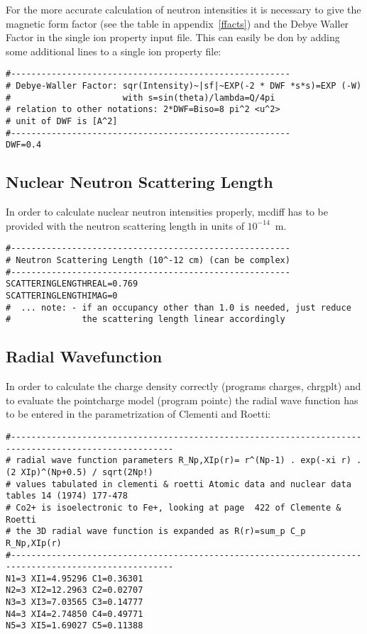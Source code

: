 For the more accurate calculation of neutron intensities it is
necessary to give the magnetic form factor (see the table in appendix~\ref{ffacts})
and the Debye Waller Factor in the single ion property input file. This can
easily be don by adding some additional lines to a single ion property file:
{\footnotesize
\begin{verbatim}
#-------------------------------------------------------
# Debye-Waller Factor: sqr(Intensity)~|sf|~EXP(-2 * DWF *s*s)=EXP (-W)
#                      with s=sin(theta)/lambda=Q/4pi
# relation to other notations: 2*DWF=Biso=8 pi^2 <u^2>
# unit of DWF is [A^2]
#-------------------------------------------------------
DWF=0.4
\end{verbatim}
}

\subsection{Nuclear Neutron Scattering Length}

In order to calculate nuclear neutron intensities properly, {\prg mcdiff} has to
be provided with the neutron scattering length in units of $10^{-14}$~m.
{\footnotesize
\begin{verbatim}
#-------------------------------------------------------
# Neutron Scattering Length (10^-12 cm) (can be complex)
#-------------------------------------------------------
SCATTERINGLENGTHREAL=0.769
SCATTERINGLENGTHIMAG=0
#  ... note: - if an occupancy other than 1.0 is needed, just reduce 
#              the scattering length linear accordingly
\end{verbatim}
}

\subsection{Radial Wavefunction}

In order to calculate the charge density correctly (programs {\prg charges, chrgplt}) and
to evaluate the pointcharge model (program {\prg pointc}) the radial wave function has to be entered in the %
parametrization of Clementi and Roetti:
{\footnotesize
\begin{verbatim}
#------------------------------------------------------------------------------------------------------
# radial wave function parameters R_Np,XIp(r)= r^(Np-1) . exp(-xi r) . (2 XIp)^(Np+0.5) / sqrt(2Np!)  
# values tabulated in clementi & roetti Atomic data and nuclear data tables 14 (1974) 177-478
# Co2+ is isoelectronic to Fe+, looking at page  422 of Clemente & Roetti 
# the 3D radial wave function is expanded as R(r)=sum_p C_p R_Np,XIp(r)
#------------------------------------------------------------------------------------------------------
N1=3 XI1=4.95296 C1=0.36301 
N2=3 XI2=12.2963 C2=0.02707 
N3=3 XI3=7.03565 C3=0.14777
N4=3 XI4=2.74850 C4=0.49771 
N5=3 XI5=1.69027 C5=0.11388 
\end{verbatim}
}


